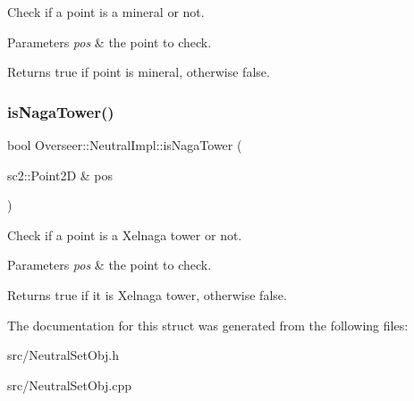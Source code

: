 Check if a point is a mineral or not. 


\begin{DoxyParams}{Parameters}
{\em pos} & the point to check. \\
\hline
\end{DoxyParams}
\begin{DoxyReturn}{Returns}
true if point is mineral, otherwise false. 
\end{DoxyReturn}
\mbox{\label{structOverseer_1_1NeutralImpl_a8e874807b118a287811311a033c98dc2}} 
\subsubsection{\texorpdfstring{is\+Naga\+Tower()}{isNagaTower()}}
{\footnotesize\ttfamily bool Overseer\+::\+Neutral\+Impl\+::is\+Naga\+Tower (\begin{DoxyParamCaption}\item[{sc2\+::\+Point2D \&}]{pos }\end{DoxyParamCaption})}



Check if a point is a Xelnaga tower or not. 


\begin{DoxyParams}{Parameters}
{\em pos} & the point to check. \\
\hline
\end{DoxyParams}
\begin{DoxyReturn}{Returns}
true if it is Xelnaga tower, otherwise false. 
\end{DoxyReturn}


The documentation for this struct was generated from the following files\+:\begin{DoxyCompactItemize}
\item 
src/Neutral\+Set\+Obj.\+h\item 
src/Neutral\+Set\+Obj.\+cpp\end{DoxyCompactItemize}
